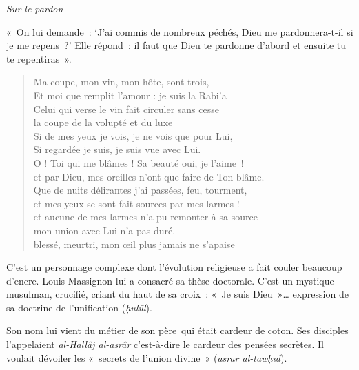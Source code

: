 \emph{Sur le pardon}

«~On lui demande~: `J'ai commis de nombreux péchés, Dieu me
pardonnera-t-il si je me repens~?' Elle répond~: il faut que Dieu te
pardonne d'abord et ensuite tu te repentiras~».

\begin{quote}
Ma coupe, mon vin, mon hôte, sont trois,\\
Et moi que remplit l'amour : je suis la Rabi'a\\
Celui qui verse le vin fait circuler sans cesse\\
la coupe de la volupté et du luxe\\
Si de mes yeux je vois, je ne vois que pour Lui,\\
Si regardée je suis, je suis vue avec Lui.\\
O ! Toi qui me blâmes ! Sa beauté oui, je l'aime~!\\
et par Dieu, mes oreilles n'ont que faire de Ton blâme.\\
Que de nuits délirantes j'ai passées, feu, tourment,\\
et mes yeux se sont fait sources par mes larmes !\\
et aucune de mes larmes n'a pu remonter à sa source\\
mon union avec Lui n'a pas duré.\\
blessé, meurtri, mon œil plus jamais ne s'apaise
\end{quote}


C'est un personnage complexe dont l'évolution religieuse a fait couler
beaucoup d'encre. Louis Massignon lui a consacré sa thèse doctorale.
C'est un mystique musulman, crucifié, criant du haut de sa croix~: «~Je
suis Dieu~»\ldots{} expression de sa doctrine de l'unification
(\emph{ḥulūl}).

Son nom lui vient du métier de son père~qui était cardeur de coton. Ses
disciples l'appelaient \emph{al-Hallâj al-asrâr} c'est-à-dire le cardeur
des pensées secrètes. Il voulait dévoiler les «~secrets de l'union
divine~» (\emph{asrār al-tawḥīd}).

